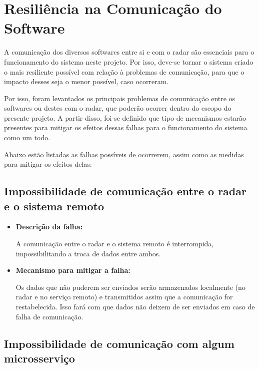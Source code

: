 \section{Resiliência na Comunicação do Software}

A comunicação dos diversos softwares entre si e com o radar são essenciais para o funcionamento do sistema neste projeto. Por isso, deve-se tornar o sistema criado o mais resiliente possível com relação à problemas de comunicação, para que o impacto desses seja o menor possível, caso ocorreram.

Por isso, foram levantados os principais problemas de comunicação entre os softwares ou destes com o radar, que poderão ocorrer dentro do escopo do presente projeto. A partir disso, foi-se definido que tipo de mecanismos estarão presentes para mitigar os efeitos dessas falhas para o funcionamento do sistema como um todo.

Abaixo estão listadas as falhas possíveis de ocorrerem, assim como as medidas para mitigar os efeitos delas:

\subsection{Impossibilidade de comunicação entre o radar e o sistema remoto}

\begin{itemize}
    \item \textbf{Descrição da falha:}

    A comunicação entre o radar e o sistema remoto é interrompida, impossibilitando a troca de dados entre ambos.

    \item \textbf{Mecanismo para mitigar a falha:}

    Os dados que não puderem ser enviados serão armazenados localmente (no radar e no serviço remoto) e transmitidos assim que a comunicação for restabelecida. Isso fará com que dados não deixem de ser enviados em caso de falha de comunicação.
\end{itemize}

\subsection{Impossibilidade de comunicação com algum microsserviço}


